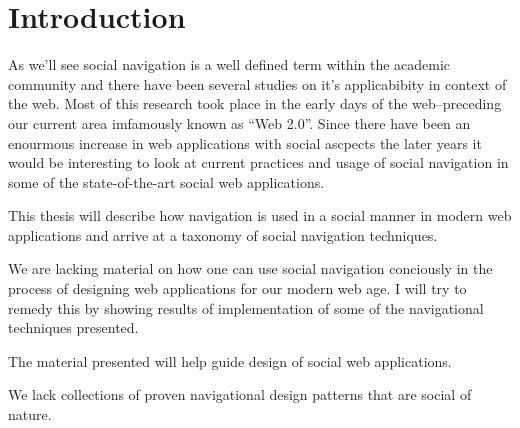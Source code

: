 \chapter{Introduction}

%
%
%
% 
%
% 


As we'll see social navigation is a well defined term within the academic
community and there have been several studies on it's applicabibity in context
of the web. Most of this research took place in the early days of the
web--preceding our current area imfamously known as ``Web 2.0''. Since
there have been an enourmous increase in web applications with social ascpects
the later years it would be interesting to look at current practices and usage
of social navigation in some of the state-of-the-art social web applications.

This thesis will describe how navigation is used in a social manner in modern
web applications and arrive at a taxonomy of social navigation techniques.

We are lacking material on how one can use social navigation conciously in the
process of designing web applications for our modern web age. I will try to
remedy this by showing results of implementation of some of the navigational
techniques presented.

The material presented will help guide design of social web applications.

We lack
collections of proven navigational design patterns that are social of nature.


